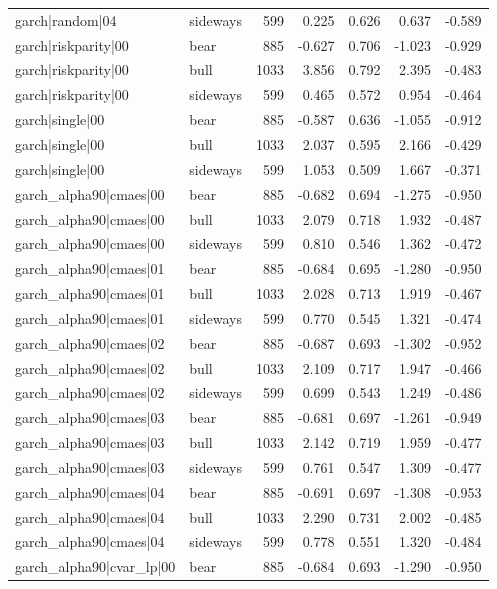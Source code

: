 \begin{table}
\begin{tabular}{llrrrrr}
garch|random|04 & sideways & 599 & 0.225 & 0.626 & 0.637 & -0.589 \\
garch|riskparity|00 & bear & 885 & -0.627 & 0.706 & -1.023 & -0.929 \\
garch|riskparity|00 & bull & 1033 & 3.856 & 0.792 & 2.395 & -0.483 \\
garch|riskparity|00 & sideways & 599 & 0.465 & 0.572 & 0.954 & -0.464 \\
garch|single|00 & bear & 885 & -0.587 & 0.636 & -1.055 & -0.912 \\
garch|single|00 & bull & 1033 & 2.037 & 0.595 & 2.166 & -0.429 \\
garch|single|00 & sideways & 599 & 1.053 & 0.509 & 1.667 & -0.371 \\
garch\_alpha90|cmaes|00 & bear & 885 & -0.682 & 0.694 & -1.275 & -0.950 \\
garch\_alpha90|cmaes|00 & bull & 1033 & 2.079 & 0.718 & 1.932 & -0.487 \\
garch\_alpha90|cmaes|00 & sideways & 599 & 0.810 & 0.546 & 1.362 & -0.472 \\
garch\_alpha90|cmaes|01 & bear & 885 & -0.684 & 0.695 & -1.280 & -0.950 \\
garch\_alpha90|cmaes|01 & bull & 1033 & 2.028 & 0.713 & 1.919 & -0.467 \\
garch\_alpha90|cmaes|01 & sideways & 599 & 0.770 & 0.545 & 1.321 & -0.474 \\
garch\_alpha90|cmaes|02 & bear & 885 & -0.687 & 0.693 & -1.302 & -0.952 \\
garch\_alpha90|cmaes|02 & bull & 1033 & 2.109 & 0.717 & 1.947 & -0.466 \\
garch\_alpha90|cmaes|02 & sideways & 599 & 0.699 & 0.543 & 1.249 & -0.486 \\
garch\_alpha90|cmaes|03 & bear & 885 & -0.681 & 0.697 & -1.261 & -0.949 \\
garch\_alpha90|cmaes|03 & bull & 1033 & 2.142 & 0.719 & 1.959 & -0.477 \\
garch\_alpha90|cmaes|03 & sideways & 599 & 0.761 & 0.547 & 1.309 & -0.477 \\
garch\_alpha90|cmaes|04 & bear & 885 & -0.691 & 0.697 & -1.308 & -0.953 \\
garch\_alpha90|cmaes|04 & bull & 1033 & 2.290 & 0.731 & 2.002 & -0.485 \\
garch\_alpha90|cmaes|04 & sideways & 599 & 0.778 & 0.551 & 1.320 & -0.484 \\
garch\_alpha90|cvar\_lp|00 & bear & 885 & -0.684 & 0.693 & -1.290 & -0.950 \\

\end{tabular}
\end{table}
